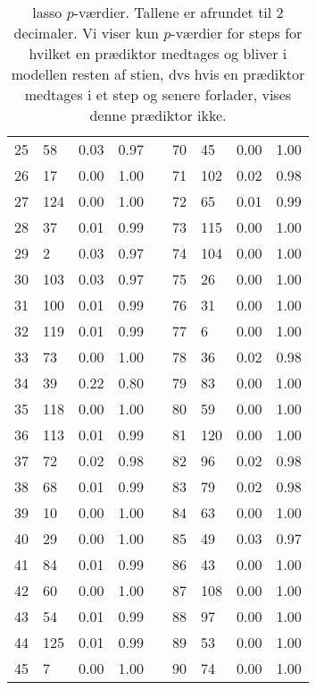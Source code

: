 \begin{small}
\begin{table}[ht]
\begin{tabular}{lllllllll}
  25 & 58 & 0.03 & 0.97 & & 70 & 45 & 0.00 & 1.00 \\  
  26 & 17 & 0.00 & 1.00 & & 71 & 102 & 0.02 & 0.98 \\ 
  27 & 124 & 0.00 & 1.00 & & 72 & 65 & 0.01 & 0.99 \\ 
  28 & 37 & 0.01 & 0.99 & & 73 & 115 & 0.00 & 1.00 \\ 
  29 & 2 & 0.03 & 0.97 & & 74 & 104 & 0.00 & 1.00 \\ 
  30 & 103 & 0.03 & 0.97 & & 75 & 26 & 0.00 & 1.00 \\ 
  31 & 100 & 0.01 & 0.99 & & 76 & 31 & 0.00 & 1.00 \\ 
  32 & 119 & 0.01 & 0.99 & & 77 & 6 & 0.00 & 1.00 \\ 
  33 & 73 & 0.00 & 1.00 & & 78 & 36 & 0.02 & 0.98 \\ 
  34 & 39 & 0.22 & 0.80 & & 79 & 83 & 0.00 & 1.00 \\  
  35 & 118 & 0.00 & 1.00 & & 80 & 59 & 0.00 & 1.00 \\ 
  36 & 113 & 0.01 & 0.99 & & 81 & 120 & 0.00 & 1.00 \\
  37 & 72 & 0.02 & 0.98 & & 82 & 96 & 0.02 & 0.98 \\ 
  38 & 68 & 0.01 & 0.99 & & 83 & 79 & 0.02 & 0.98 \\
  39 & 10 & 0.00 & 1.00 & & 84 & 63 & 0.00 & 1.00 \\ 
  40 & 29 & 0.00 & 1.00 & & 85 & 49 & 0.03 & 0.97 \\ 
  41 & 84 & 0.01 & 0.99 & & 86 & 43 & 0.00 & 1.00 \\ 
  42 & 60 & 0.00 & 1.00 & & 87 & 108 & 0.00 & 1.00 \\ 
  43 & 54 & 0.01 & 0.99 & & 88 & 97 & 0.00 & 1.00 \\ 
  44 & 125 & 0.01 & 0.99 & & 89 & 53 & 0.00 & 1.00 \\ 
  45 & 7 & 0.00 & 1.00 & & 90 & 74 & 0.00 & 1.00 \\ 
\bottomrule
\end{tabular}
\caption{lasso \(p\)-værdier.
Tallene er afrundet til 2 decimaler.
Vi viser kun \(p\)-værdier for steps for hvilket en prædiktor medtages og bliver i modellen resten af stien, dvs hvis en prædiktor medtages i et step og senere forlader, vises denne prædiktor ikke.} \label{tab:covTest}
\end{table} 
\end{small}